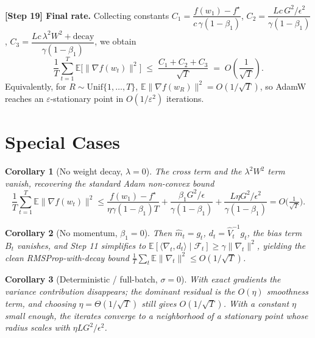 \documentclass[11pt]{article}
\newtheorem{corollary}{Corollary}
\begin{document}
\noindent\textbf{[Step 19] Final rate.}
Collecting constants
$C_1 = \dfrac{f(w_1)-f^\star}{c\,\gamma(1-\beta_1)}$,
$C_2 = \dfrac{Lc\,G^2/\epsilon^2}{\gamma(1-\beta_1)}$,
$C_3 = \dfrac{Lc\,\lambda^2W^2 + \text{decay}}{\gamma(1-\beta_1)}$, we obtain
\[
\boxed{\;
\frac{1}{T}\sum_{t=1}^{T}\mathbb{E}\big[\|\nabla f(w_t)\|^2\big]
\;\le\; \frac{C_1+C_2+C_3}{\sqrt T}
\;=\; O\!\left(\frac{1}{\sqrt T}\right).
\;}
\]
Equivalently, for $R\sim\mathrm{Unif}\{1,\dots,T\}$,
$\mathbb{E}\|\nabla f(w_R)\|^2 = O(1/\sqrt T)$, so AdamW reaches an
$\varepsilon$-stationary point in $O(1/\varepsilon^2)$ iterations.

\section*{Special Cases}
\begin{corollary}[No weight decay, $\lambda=0$]
The cross term and the $\lambda^2W^2$ term vanish, recovering the standard Adam
non-convex bound
\[
\frac{1}{T}\sum_{t=1}^{T}\mathbb{E}\|\nabla f(w_t)\|^2
\le \frac{f(w_1)-f^\star}{\eta\gamma(1-\beta_1)T}
+ \frac{\beta_1 G^2/\epsilon}{\gamma(1-\beta_1)}
+ \frac{L\eta G^2/\epsilon^2}{\gamma(1-\beta_1)} = O\!\Big(\tfrac{1}{\sqrt T}\Big).
\]
\end{corollary}

\begin{corollary}[No momentum, $\beta_1=0$]
Then $\hat m_t = g_t$, $d_t=\hat V_t^{-1}g_t$, the bias term $B_t$ vanishes, and
Step 11 simplifies to
$\mathbb{E}[\langle\nabla_t,d_t\rangle\mid\mathcal F_t]\ge\gamma\|\nabla_t\|^2$,
yielding the clean RMSProp-with-decay bound
$\frac1T\sum_t\mathbb{E}\|\nabla_t\|^2 \le O(1/\sqrt T)$.
\end{corollary}

\begin{corollary}[Deterministic / full-batch, $\sigma=0$]
With exact gradients the variance contribution disappears; the dominant residual is
the $O(\eta)$ smoothness term, and choosing $\eta=\Theta(1/\sqrt T)$ still gives
$O(1/\sqrt T)$. With a constant $\eta$ small enough, the iterates converge to a
neighborhood of a stationary point whose radius scales with $\eta L G^2/\epsilon^2$.
\end{corollary}
\end{document}
